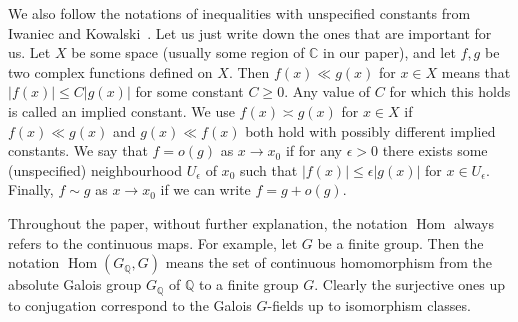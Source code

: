\documentclass[12pt,a4paper]{amsart}
\numberwithin{equation}{section}%
\theoremstyle{plain}%
\theoremstyle{definition}%
\theoremstyle{remark}%
\begin{document}
	We also follow the notations of inequalities with unspecified constants from Iwaniec and Kowalski~\cite[Introduction, p.7]{iwaniec2004analytic}.
	Let us just write down the ones that are important for us.
	Let $X$ be some space (usually some region of $\mathbb{C}$ in our paper), and let $f,g$ be two complex functions defined on $X$.
	Then $f(x)\ll g(x)$ for $x\in X$ means that $\lvert f(x)\rvert\leq C\lvert g(x)\rvert$ for some constant $C\geq0$.
	Any value of $C$ for which this holds is called an implied constant.
	We use $f(x)\asymp g(x)$ for $x\in X$ if $f(x)\ll g(x)$ and $g(x)\ll f(x)$ both hold with possibly different implied constants.
	We say that $f=o(g)$ as $x\to x_0$ if for any $\epsilon>0$ there exists some (unspecified) neighbourhood $U_\epsilon$ of $x_0$ such that $\lvert f(x)\rvert\leq\epsilon\lvert g(x)\rvert$ for $x\in U_\epsilon$.
	Finally, $f\sim g$ as $x\to x_0$ if we can write $f=g+o(g)$.
	
	Throughout the paper, without further explanation, the notation $\operatorname{Hom}$ always refers to the continuous maps.
	For example, let $G$ be a finite  group.
	Then the notation $\operatorname{Hom}(G_{\mathbb{Q}},G)$ means the set of continuous homomorphism from the absolute Galois group $G_{\mathbb{Q}}$ of $\mathbb{Q}$ to a finite group $G$.
	Clearly the surjective ones up to conjugation correspond to the Galois $G$-fields up to isomorphism classes.
	
\end{document}
